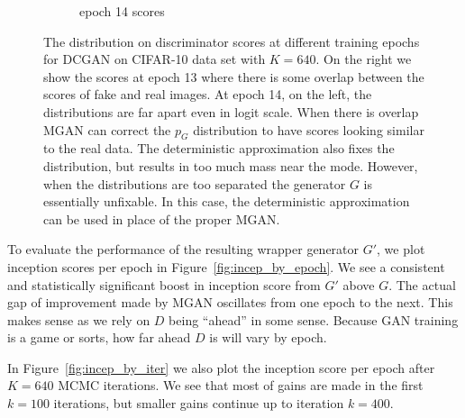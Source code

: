 \documentclass{article}
\newcommand{\PG}{{p_G}}
\begin{document}
\begin{figure}
\begin{subfigure}[b]{0.49\textwidth}
       \caption{epoch 14 scores}
       \label{fig:score_dist_no_overlap}
    \end{subfigure}
    \caption{{\small
    The distribution on discriminator scores at different training epochs for DCGAN on CIFAR-10 data set with $K=640$.
    On the right we show the scores at epoch 13 where there is some overlap between the scores of fake and real images.
    At epoch 14, on the left, the distributions are far apart even in logit scale.
    When there is overlap MGAN can correct the $\PG$ distribution to have scores looking similar to the real data.
    The deterministic approximation also fixes the distribution, but results in too much mass near the mode.
    However, when the distributions are too separated the generator $G$ is essentially unfixable.
    In this case, the deterministic approximation can be used in place of the proper MGAN\@.
    }}
\end{figure}

To evaluate the performance of the resulting wrapper generator $G'$, we plot inception scores per epoch in Figure~\ref{fig:incep_by_epoch}.
We see a consistent and statistically significant boost in inception score from $G'$ above $G$.
The actual gap of improvement made by MGAN oscillates from one epoch to the next.
This makes sense as we rely on $D$ being ``ahead'' in some sense.
Because GAN training is a game or sorts, how far ahead $D$ is will vary by epoch.

In Figure~\ref{fig:incep_by_iter} we also plot the inception score per epoch after $K=640$ MCMC iterations.
We see that most of gains are made in the first $k=100$ iterations, but smaller gains continue up to iteration $k=400$.
\end{document}
